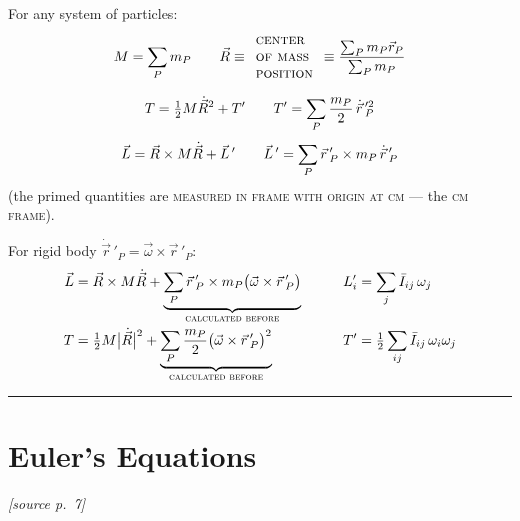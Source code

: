 \documentclass[11pt]{article}
\newcommand{\src}[1]{\par\nobreak\vspace{-4pt}\hfill{\footnotesize\itshape[source p.~#1]}\par\nobreak\vspace{2pt}}
\begin{document}
For any system of particles:
\begin{gather*}
M = \sum_P m_P
\qquad
\vec{R} \equiv \begin{array}{l}\textsc{center}\\ \textsc{of mass}\\ \textsc{position}\end{array}
\equiv \frac{\sum_P m_P \vec{r}_P}{\sum_P m_P}\\[6pt]
T = \tfrac{1}{2} M \dot{\vec{R}}^{2} + T' \qquad
T' = \sum_P \frac{m_P}{2}\,\dot{\vec{r}}\,'^{2}_P\\[4pt]
\vec{L} = \vec{R}\times M\dot{\vec{R}} + \vec{L}\,' \qquad
\vec{L}\,' = \sum_P \vec{r}\,'_P\times m_P\,\dot{\vec{r}}\,'_P
\end{gather*}
(the primed quantities are \textsc{measured in frame with origin at cm} --- the \textsc{cm frame}).

For rigid body $\dot{\vec{r}}\,'_P = \vec{\omega}\times\vec{r}\,'_P$:
\begin{align*}
\vec{L} &= \vec{R}\times M\dot{\vec{R}}
+ \underbrace{\sum_P \vec{r}\,'_P\times m_P\bigl(\vec{\omega}\times\vec{r}\,'_P\bigr)}_{\textsc{calculated before}}
&&\qquad L'_i = \sum_j \bar{I}_{ij}\,\omega_j\\
T &= \tfrac{1}{2} M \bigl|\dot{\vec{R}}\bigr|^{2}
+ \underbrace{\sum_P \frac{m_P}{2}\bigl(\vec{\omega}\times\vec{r}\,'_P\bigr)^{2}}_{\textsc{calculated before}}
&&\qquad T' = \tfrac{1}{2}\sum_{ij}\bar{I}_{ij}\,\omega_i\omega_j
\end{align*}

\bigskip\hrule\bigskip

\section*{Euler's Equations}
\src{7}
\end{document}
